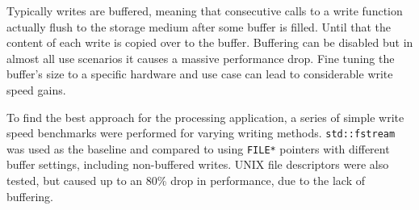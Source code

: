 Typically writes are buffered, meaning that consecutive calls to a write function
actually flush to the storage medium after some buffer is filled. Until that 
the content of each write is copied over to the buffer.
Buffering can be disabled but in almost all use scenarios it causes
a massive performance drop. Fine tuning the buffer's size 
to a specific hardware and use case can lead to considerable write speed gains.


To find the best approach for the processing application, a series of simple 
write speed benchmarks were performed for varying writing methods. 
\lstinline{std::fstream} was used as the baseline and compared
to using \lstinline{FILE*} pointers with different buffer settings,
including non-buffered writes. UNIX file descriptors were also tested,
but caused up to an 80\% drop in performance, due to the lack of buffering.

